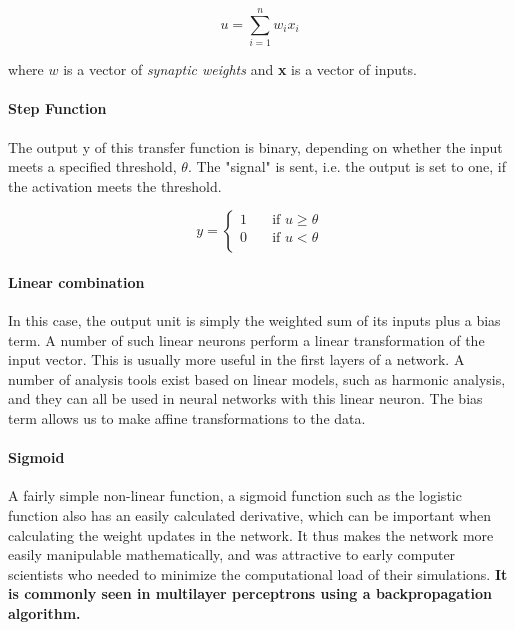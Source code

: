 \documentclass[14pt,a4paper]{extarticle}
\begin{document}
	\begin{equation}
		u = \sum_{i=1}^n w_{i}x_{i}
	\end{equation}
	
	where $w$ is a vector of \textit{synaptic weights} and \textbf{x} is a vector of inputs.
	
	\paragraph{Step Function}
	
	The output y of this transfer function is binary, depending on whether the input meets a specified threshold, $\theta$. The "signal" is sent, i.e. the output is set to one, if the activation meets the threshold.
	
	\[ y =
		\begin{cases}
		1 & \quad \text{if } u \geq \theta \\
		0 & \quad \text{if } u < \theta \\
		\end{cases}
	\]
	
	
	
	\paragraph{Linear combination}
	In this case, the output unit is simply the weighted sum of its inputs plus a bias term. A number of such linear neurons perform a linear transformation of the input vector. This is usually more useful in the first layers of a network. A number of analysis tools exist based on linear models, such as harmonic analysis, and they can all be used in neural networks with this linear neuron. The bias term allows us to make affine transformations to the data.
	
	\paragraph{Sigmoid}
	A fairly simple non-linear function, a sigmoid function such as the logistic function also has an easily calculated derivative, which can be important when calculating the weight updates in the network. It thus makes the network more easily manipulable mathematically, and was attractive to early computer scientists who needed to minimize the computational load of their simulations.  \textbf{It is commonly seen in multilayer perceptrons using a backpropagation algorithm.}
	
\end{document}
